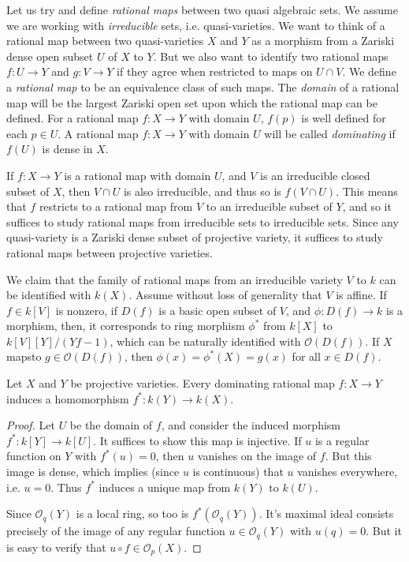 Let us try and define \emph{rational maps} between two quasi algebraic sets. We assume we are working with \emph{irreducible} sets, i.e. quasi-varieties. We want to think of a rational map between two quasi-varieties $X$ and $Y$ as a morphism from a Zariski dense open subset $U$ of $X$ to $Y$. But we also want to identify two rational maps $f: U \to Y$ and $g: V \to Y$ if they agree when restricted to maps on $U \cap V$. We define a \emph{rational map} to be an equivalence class of such maps. The \emph{domain} of a rational map will be the largest Zariski open set upon which the rational map can be defined. For a rational map $f: X \to Y$ with domain $U$, $f(p)$ is well defined for each $p \in U$. A rational map $f: X \to Y$ with domain $U$ will be called \emph{dominating} if $f(U)$ is dense in $X$.

If $f: X \to Y$ is a rational map with domain $U$, and $V$ is an irreducible closed subset of $X$, then $V \cap U$ is also irreducible, and thus so is $f(V \cap U)$. This means that $f$ restricts to a rational map from $V$ to an irreducible subset of $Y$, and so it suffices to study rational maps from irreducible sets to irreducible sets. Since any quasi-variety is a Zariski dense subset of projective variety, it suffices to study rational maps between projective varieties.

\begin{example}
    We claim that the family of rational maps from an irreducible variety $V$ to $k$ can be identified with $k(X)$. Assume without loss of generality that $V$ is affine. If $f \in k[V]$ is nonzero, if $D(f)$ is a basic open subset of $V$, and $\phi: D(f) \to k$ is a morphism, then, it corresponds to ring morphism $\phi^*$ from $k[X]$ to $k[V][Y]/(Yf - 1)$, which can be naturally identified with $\mathcal{O}(D(f))$. If $X$ mapsto $g \in \mathcal{O}(D(f))$, then $\phi(x) = \phi^*(X) = g(x)$ for all $x \in D(f)$.
\end{example}

\begin{lemma}
    Let $X$ and $Y$ be projective varieties. Every dominating rational map $f: X \to Y$ induces a homomorphism $f^*: k(Y) \to k(X)$.
\end{lemma}
\begin{proof}
    Let $U$ be the domain of $f$, and consider the induced morphism $f^*: k[Y] \to k[U]$. It suffices to show this map is injective. If $u$ is a regular function on $Y$ with $f^*(u) = 0$, then $u$ vanishes on the image of $f$. But this image is dense, which implies (since $u$ is continuous) that $u$ vanishes everywhere, i.e. $u = 0$. Thus $f^*$ induces a unique map from $k(Y)$ to $k(U)$.

    Since $\mathcal{O}_q(Y)$ is a local ring, so too is $f^*(\mathcal{O}_q(Y))$. It's maximal ideal consists precisely of the image of any regular function $u \in \mathcal{O}_q(Y)$ with $u(q) = 0$. But it is easy to verify that $u \circ f \in \mathcal{O}_p(X)$.
\end{proof}

